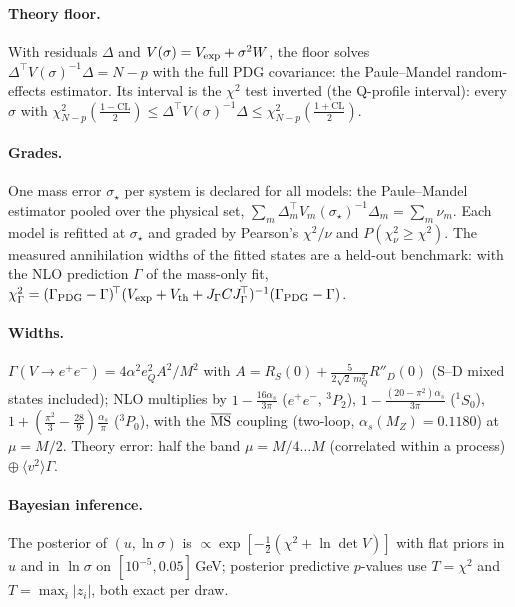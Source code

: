 \documentclass[11pt,a4paper]{article}
\numberwithin{equation}{section}
\theoremstyle{definition}
\theoremstyle{plain}
\theoremstyle{remark}
\numberwithin{algorithm}{section}
\begin{document}
\paragraph{Theory floor.} With residuals $\Delta$ and $V(\sigma)=V_{\rm exp}+\sigma^2W$, the
floor solves $\Delta^{\!\top}V(\sigma)^{-1}\Delta=N-p$ with the full PDG covariance: the
Paule--Mandel random-effects estimator. Its interval is the $\chi^2$ test inverted (the
Q-profile interval): every $\sigma$ with $\chi^2_{N-p}(\tfrac{1-\mathrm{CL}}{2})\le
\Delta^{\!\top}V(\sigma)^{-1}\Delta\le\chi^2_{N-p}(\tfrac{1+\mathrm{CL}}{2})$.

\paragraph{Grades.} One mass error $\sigma_\star$ per system is declared for all models: the
Paule--Mandel estimator pooled over the physical set,
$\sum_m\Delta_m^{\!\top}V_m(\sigma_\star)^{-1}\Delta_m=\sum_m\nu_m$. Each model is refitted at
$\sigma_\star$ and graded by Pearson's $\chi^2/\nu$ and $P(\chi^2_\nu\ge\chi^2)$. The measured
annihilation widths of the fitted states are a held-out benchmark: with the NLO prediction
$\Gamma$ of the mass-only fit, $\chi^2_\Gamma=(\Gamma_{\rm PDG}-\Gamma)^{\!\top}(V_{\rm exp}
+V_{\rm th}+J_\Gamma C J_\Gamma^{\!\top})^{-1}(\Gamma_{\rm PDG}-\Gamma)$.

\paragraph{Widths.} $\Gamma(V\to e^+e^-)=4\alpha^2e_Q^2A^2/M^2$ with
$A=R_S(0)+\tfrac{5}{2\sqrt2\,m_Q^2}R''_D(0)$ (S--D mixed states included); NLO multiplies by
$1-\tfrac{16\alpha_s}{3\pi}$ ($e^+e^-$, $^3P_2$), $1-\tfrac{(20-\pi^2)\alpha_s}{3\pi}$ ($^1S_0$),
$1+(\tfrac{\pi^2}{3}-\tfrac{28}{9})\tfrac{\alpha_s}{\pi}$ ($^3P_0$), with the
$\overline{\rm MS}$ coupling (two-loop, $\alpha_s(M_Z)=0.1180$) at $\mu=M/2$. Theory error:
half the band $\mu=M/4\ldots M$ (correlated within a process) $\oplus\ \langle v^2\rangle\Gamma$.

\paragraph{Bayesian inference.} The posterior of $(u,\ln\sigma)$ is
$\propto\exp[-\tfrac12(\chi^2+\ln\det V)]$ with flat priors in $u$ and in $\ln\sigma$ on
$[10^{-5},0.05]$\,GeV; posterior predictive $p$-values use $T=\chi^2$ and $T=\max_i|z_i|$,
both exact per draw.
\end{document}
